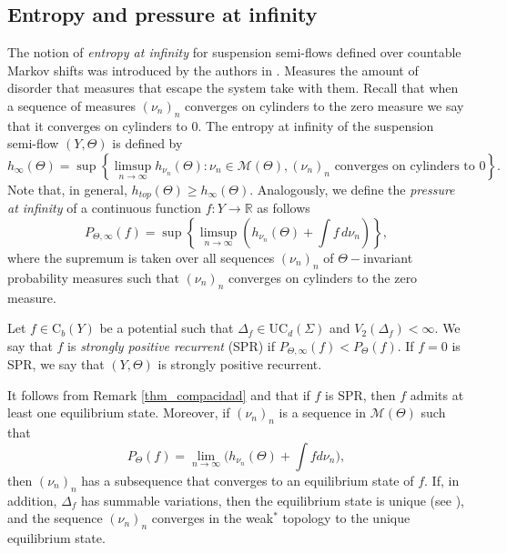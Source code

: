 \documentclass[letterpaper,11pt]{amsart}
\numberwithin{equation}{section}     %
\newcommand{\M}{\mathcal{M}}
\newcommand{\R}{\mathbb{R}}
\def\R{{\mathbb R}}
\def\M{{\mathcal M}}
\def\ge{\geqslant}
\def\M{\mathcal{M}}
\begin{document}
\subsection{Entropy and pressure at infinity} \label{sec:pre_imfty_flow}
The notion of \emph{entropy at infinity}  for suspension semi-flows defined over countable Markov shifts was introduced by the authors in \cite{irv}. Measures the amount of disorder that measures that escape the system take with them. Recall that when a sequence of measures $(\nu_n)_n$ converges on cylinders to the zero measure we say that it converges on cylinders to $0$. The entropy at infinity of the suspension semi-flow $(Y,\Theta)$  is defined by
\begin{equation*}
h_{\infty}(\Theta)= \sup \left\{\limsup _{n \to \infty}h_{\nu_n}(\Theta): \nu_n \in \M(\Theta),  (\nu_n)_n \text{ converges on cylinders to  } 0 \right\}.
\end{equation*}
Note that, in general, $h_{top}(\Theta)\ge h_\infty(\Theta)$.  Analogously, we define the \emph{pressure at infinity} of a continuous function  $f:Y\to\R$  as follows
\begin{equation*}
P_{\Theta,\infty}(f)= \sup \left\{\limsup _{n \to \infty} \left( h_{\nu_n}(\Theta)+\int f \, d\nu_n \right) \right\},
\end{equation*}
where the supremum is taken over all sequences $(\nu_n)_n$  of $\Theta-$invariant probability measures  such that  $(\nu_n)_n$ converges on cylinders to the zero measure.


\begin{definition}  
Let  $f \in \text{C}_b(Y)$ be a potential such that $\Delta_f\in\mathrm{UC}_d(\Sigma)$ and $V_2(\Delta_f)<\infty$. We say that $f$ is \emph{strongly positive recurrent} (SPR) if $P_{\Theta,\infty}(f)<P_\Theta(f)$. If $f=0$ is SPR, we say that $(Y, \Theta)$ is strongly positive recurrent. 
\end{definition}

\begin{remark}\label{rem:forder}
It follows from Remark \ref{thm_compacidad} and \cite[Theorem 8.1]{v} that if $f$ is SPR, then $f$ admits at least one equilibrium state. Moreover, if $(\nu_n)_n$ is a sequence in $\mathcal{M}(\Theta)$ such that $$P_\Theta(f)=\lim_{n\to\infty}\bigg(h_{\nu_n}(\Theta)+\int f d\nu_n\bigg),$$ then $(\nu_n)_n$ has a subsequence that converges to an equilibrium state of $f$. If, in addition, $\Delta_f$ has summable variations, then the equilibrium state is unique (see  \cite[Theorems~3.4 and 3.5]{ijt}), and the sequence $(\nu_n)_n$ converges in the weak$^\ast$ topology to the unique equilibrium state.
\end{remark}
\end{document}

